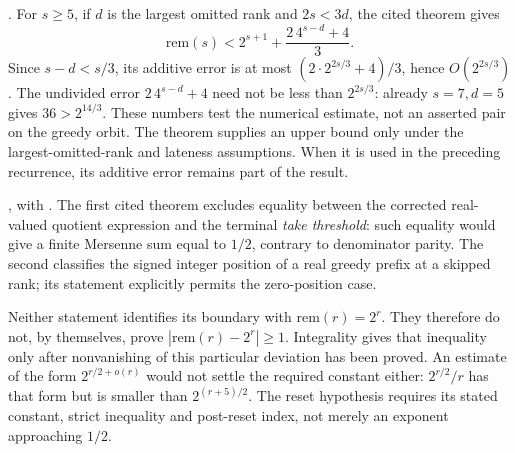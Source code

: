 \begin{obs}
.
For $s\ge5$, if $d$ is the largest omitted rank and $2s<3d$,
the cited theorem gives
\[
 \mathrm{rem}(s)<2^{s+1}+\frac{2\,4^{s-d}+4}{3}.
\]
Since $s-d<s/3$, its additive error is at most
$(2\cdot2^{2s/3}+4)/3$, hence $O(2^{2s/3})$.
The undivided error $2\,4^{s-d}+4$ need not be less than
$2^{2s/3}$: already $s=7,d=5$ gives $36>2^{14/3}$.
These numbers test the numerical estimate, not an asserted pair on the
greedy orbit.  The theorem supplies an upper bound only under the
largest-omitted-rank and lateness assumptions.  When it is used in the
preceding recurrence, its additive error remains part of the result.
\end{obs}

\begin{obs}
, with
.
The first cited theorem excludes equality between the corrected
real-valued quotient expression and the terminal \emph{take threshold}:
such equality would give a finite Mersenne sum equal to $1/2$, contrary
to denominator parity.  The second classifies the signed integer
position of a real greedy prefix at a skipped rank; its statement
explicitly permits the zero-position case.

Neither statement identifies its boundary with
$\mathrm{rem}(r)=2^r$.  They therefore do not, by themselves, prove
$|\mathrm{rem}(r)-2^r|\ge1$.  Integrality gives that inequality only
after nonvanishing of this particular deviation has been proved.
An estimate of the form $2^{r/2+o(r)}$ would not settle the required
constant either: $2^{r/2}/r$ has that form but is smaller than
$2^{(r+5)/2}$.  The reset hypothesis requires its stated constant,
strict inequality and post-reset index, not merely an exponent
approaching $1/2$.
\end{obs}

